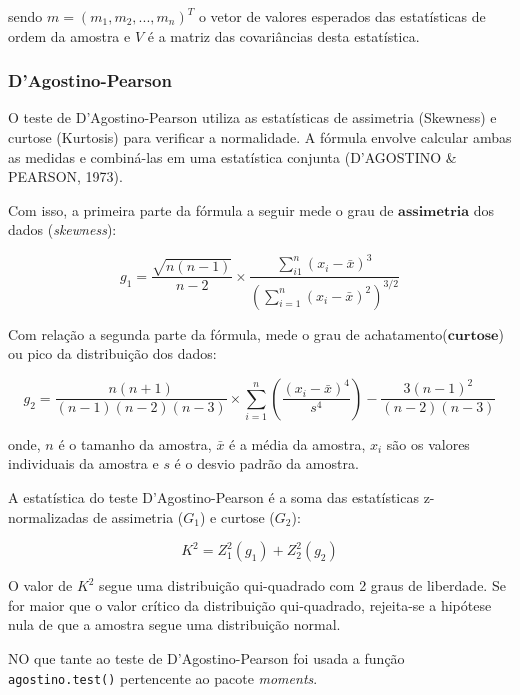 \documentclass[a4paper,11pt]{article} %
\begin{document}
sendo $m=(m_{1},m_{2},...,m_{n})^{T}$ o vetor de valores esperados das estatísticas de ordem da amostra e $V$ é a matriz das covariâncias desta estatística.\vskip0.3cm

\subsubsection{D’Agostino-Pearson}

O teste de D'Agostino-Pearson utiliza as estatísticas de assimetria (Skewness) e curtose (Kurtosis) para verificar a normalidade. A fórmula envolve calcular ambas as medidas e combiná-las em uma estatística conjunta (D'AGOSTINO \& PEARSON, 1973).\vskip0.3cm

Com isso, a primeira parte da fórmula a seguir mede o grau de $\textbf{assimetria}$ dos dados (\textit{skewness}):

\begin{equation}
g_{1} = \frac{\sqrt{n(n-1)}}{n-2} \times \frac{\sum_{i1}^{n} (x_{i}-\bar{x})^{3}}{\left( \sum_{i=1}^{n} (x_{i}-\bar{x})^{2}\right)^{3/2}}
\end{equation}

Com relação a segunda parte da fórmula, mede o grau de achatamento($\textbf{curtose}$) ou pico da distribuição dos dados:

\begin{equation}
g_{2} = \frac{n(n+1)}{(n-1)(n-2)(n-3)} \times \sum_{i=1}^{n} \left(  \frac{(x_{i}-\bar{x})^{4}}{s^{4}} \right) - \frac{3(n-1)^{2}}{(n-2)(n-3)}
\end{equation}

onde, $n$ é o tamanho da amostra, $\bar{x}$ é a média da amostra, $x_{i}$ são os valores individuais da amostra e $s$ é o desvio padrão da amostra.\vskip0.3cm

A estatística do teste  D'Agostino-Pearson é a soma das estatísticas z-normalizadas de assimetria ($G_{1}$) e curtose ($G_{2}$):\vskip0.3cm

\begin{equation}
    K^{2} = Z_{1}^{2}(g_{1}) + Z_{2}^{2}(g_{2})
\end{equation}

O valor de $K^{2}$ segue uma distribuição qui-quadrado com 2 graus de liberdade. Se for maior que o valor crítico da distribuição qui-quadrado, rejeita-se a hipótese nula de que a amostra segue uma distribuição normal.\vskip0.3cm

NO que tante ao teste de D’Agostino-Pearson foi usada a função \texttt{agostino.test()} pertencente ao pacote \textit{moments}.\vskip0.3cm
\end{document}
